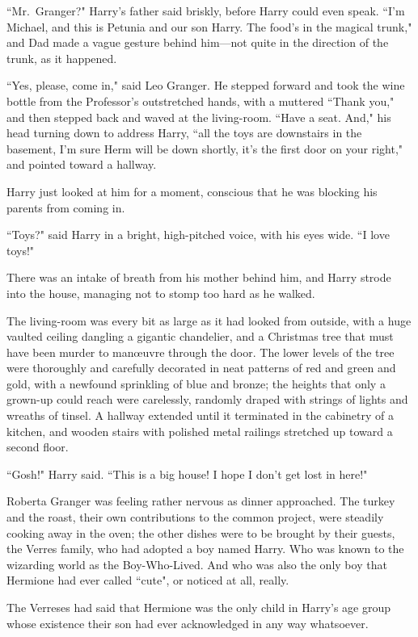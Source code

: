 ``Mr.~Granger?" Harry's father said briskly, before Harry could even speak. ``I'm Michael, and this is Petunia and our son Harry. The food's in the magical trunk," and Dad made a vague gesture behind him—not quite in the direction of the trunk, as it happened.

``Yes, please, come in," said Leo Granger. He stepped forward and took the wine bottle from the Professor's outstretched hands, with a muttered ``Thank you," and then stepped back and waved at the living-room. ``Have a seat. And," his head turning down to address Harry, ``all the toys are downstairs in the basement, I'm sure Herm will be down shortly, it's the first door on your right," and pointed toward a hallway.

Harry just looked at him for a moment, conscious that he was blocking his parents from coming in.

``Toys?" said Harry in a bright, high-pitched voice, with his eyes wide. ``I love toys!"

There was an intake of breath from his mother behind him, and Harry strode into the house, managing not to stomp too hard as he walked.

The living-room was every bit as large as it had looked from outside, with a huge vaulted ceiling dangling a gigantic chandelier, and a Christmas tree that must have been murder to manœuvre through the door. The lower levels of the tree were thoroughly and carefully decorated in neat patterns of red and green and gold, with a newfound sprinkling of blue and bronze; the heights that only a grown-up could reach were carelessly, randomly draped with strings of lights and wreaths of tinsel. A hallway extended until it terminated in the cabinetry of a kitchen, and wooden stairs with polished metal railings stretched up toward a second floor.

``Gosh!" Harry said. ``This is a big house! I hope I don't get lost in here!"

\later

Roberta Granger was feeling rather nervous as dinner approached. The turkey and the roast, their own contributions to the common project, were steadily cooking away in the oven; the other dishes were to be brought by their guests, the Verres family, who had adopted a boy named Harry. Who was known to the wizarding world as the Boy-Who-Lived. And who was also the only boy that Hermione had ever called ``cute", or noticed at all, really.

The Verreses had said that Hermione was the only child in Harry's age group whose existence their son had ever acknowledged in any way whatsoever.

